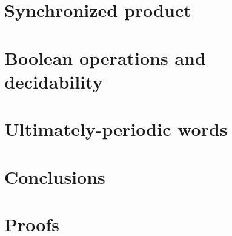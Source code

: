 \documentclass[orivec]{llncs}
\begin{document}
\section{Synchronized product}\label{sec:sync-product}


\section{Boolean operations and decidability}\label{sec:boolean-operations-decidability}

\section{Ultimately-periodic words}\label{sec:up-words}

\section{Conclusions}\label{sec:conclusions}






%

\appendix
\section{Proofs}

\end{document}
